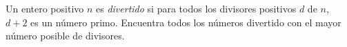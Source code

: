 Un entero positivo $n$ es \textit{divertido} si para todos los divisores positivos $d$ de $n$, $d+2$ es un número primo. Encuentra todos los números divertido con el mayor número posible de divisores.
